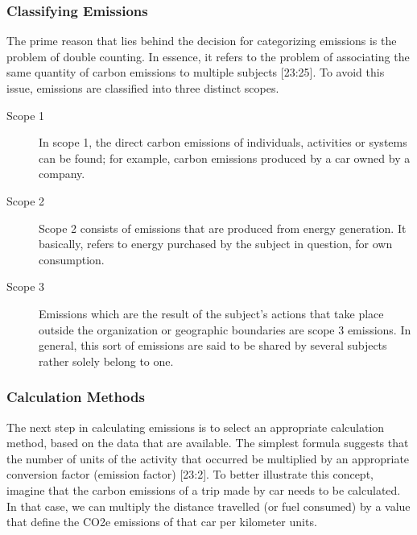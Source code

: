 \subsubsection{Classifying Emissions}
The prime reason that lies behind the decision for categorizing emissions is the problem of double counting. In essence, it refers to the problem of associating the same quantity of carbon emissions to multiple subjects [23:25]. To avoid this issue, emissions are classified into three distinct scopes.

\begin{description}
  \item[Scope 1]
        In scope 1, the direct carbon emissions of individuals, activities or systems can be found; for example, carbon emissions produced by a car owned by a company.
  \item[Scope 2] 
        Scope 2 consists of emissions that are produced from energy generation. It basically, refers to energy purchased by the subject in question, for own consumption.
  \item[Scope 3] 
        Emissions which are the result of the subject's actions that take place outside the organization or geographic boundaries are scope 3 emissions. In general, this sort of emissions are said to be shared by several subjects rather solely belong to one.
\end{description}


\subsubsection{Calculation Methods}

The next step in calculating emissions is to select an appropriate calculation method, based on the data that are available. The simplest formula suggests that the number of units of the activity that occurred be multiplied by an appropriate conversion factor (emission factor) [23:2]. To better illustrate this concept, imagine that the carbon emissions of a trip made by car needs to be calculated. In that case, we can multiply the distance travelled (or fuel consumed) by a value that define the CO2e emissions of that car per kilometer units.

